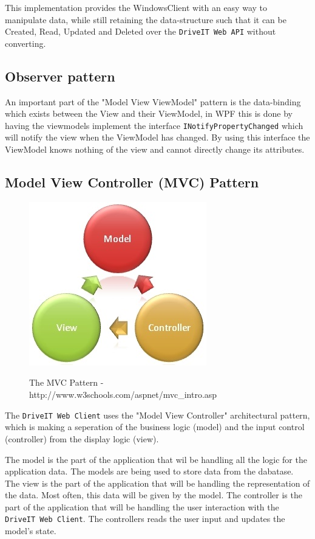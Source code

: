 This implementation provides the WindowsClient with an easy way to manipulate data, while still retaining the data-structure such that it can be Created, Read, Updated and Deleted over the \texttt{DriveIT Web API} without converting.
\subsection{Observer pattern}
An important part of the "Model View ViewModel" pattern is the data-binding which exists between the View and their ViewModel, in WPF this is done by having the viewmodels implement the interface \texttt{INotifyPropertyChanged} which will notify the view when the ViewModel has changed. By using this interface the ViewModel knows nothing of the view and cannot directly change its attributes.

\subsection{Model View Controller (MVC) Pattern}
\begin{figure}[H]
	\centering
	\includegraphics[scale=0.6]{Figures/WebImages/MVCPattern}\\
	\caption{The MVC Pattern - http://www.w3schools.com/aspnet/mvc_intro.asp}
	\label{fig:MVCPattern}
\end{figure}
The \texttt{DriveIT Web Client} uses the "Model View Controller" architectural pattern, which is making a seperation of the business logic (model) and the input control (controller) from the display logic (view).

The model is the part of the application that wil be handling all the logic for the application data. The models are being used to store data from the dabatase.
The view is the part of the application that will be handling the representation of the data. Most often, this data will be given by the model.
The controller is the part of the application that will be handling the user interaction with the \texttt{DriveIT Web Client}. The controllers reads the user input and updates the model's state.

